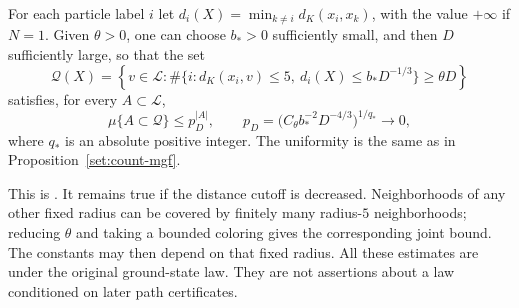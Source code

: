 \begin{proposition}\label{set:close-tail}
For each particle label $i$ let
$d_i(X)=\min_{k\ne i}d_K(x_i,x_k)$, with the value $+\infty$ if $N=1$.
Given $\theta>0$, one can choose $b_*>0$
sufficiently small, and then $D$ sufficiently large, so that the set
\[
 \mathcal Q(X)=\left\{v\in\mathcal L:
    \#\{i:d_K(x_i,v)\le5,\ d_i(X)\le b_*D^{-1/3}\}
          \ge\theta D\right\}
\]
satisfies, for every $A\subset\mathcal L$,
\begin{equation}\label{set:close-tail-bound}
 \mu\{A\subset\mathcal Q\}\le p_D^{|A|},
 \qquad
 p_D=\bigl(C_\theta b_*^{-2}D^{-4/3}\bigr)^{1/q_*}\longrightarrow0,
\end{equation}
where $q_*$ is an absolute positive integer. The uniformity is the same
as in Proposition~\ref{set:count-mgf}.
\end{proposition}

This is \cite[Proposition 3.7 and Equation (3.20)]{H}.
It remains true if the distance cutoff is decreased. Neighborhoods of
any other fixed radius can be covered by finitely many radius-$5$
neighborhoods; reducing $\theta$ and taking a bounded coloring gives
the corresponding joint bound. The constants may then depend on that
fixed radius. All these estimates are under the original ground-state
law. They are not assertions about a law conditioned on later path
certificates.

